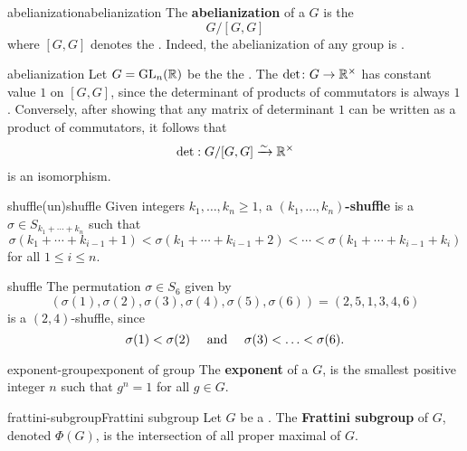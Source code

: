\begin{topic}{abelianization}{abelianization}
    The \textbf{abelianization} of a  $G$ is the 
    \[ G/[G, G] \]
    where $[G, G]$ denotes the . Indeed, the abelianization of any group is .
\end{topic}

\begin{example}{abelianization}
    Let $G = \textup{GL}_n(\mathbb{R})$ be the the . The  $\det \colon G \to \mathbb{R}^\times$ has constant value $1$ on $[G, G]$, since the determinant of products of commutators is always $1$. Conversely, after showing that any matrix of determinant $1$ can be written as a product of commutators, it follows that
    \[ \det : G / [G, G] \xrightarrow{\sim} \mathbb{R}^\times \]
    is an isomorphism.
\end{example}

\begin{topic}{shuffle}{(un)shuffle}
    Given integers $k_1, \ldots, k_n \ge 1$, a \textbf{$(k_1, \ldots, k_n)$-shuffle} is a  $\sigma \in S_{k_1 + \cdots + k_n}$ such that
    \[ \sigma(k_1 + \cdots + k_{i - 1} + 1) < \sigma(k_1 + \cdots + k_{i - 1} + 2) < \cdots < \sigma(k_1 + \cdots + k_{i - 1} + k_i) \]
    for all $1 \le i \le n$.
\end{topic}

\begin{example}{shuffle}
    The permutation $\sigma \in S_6$ given by
    \[ (\sigma(1), \sigma(2), \sigma(3), \sigma(4), \sigma(5), \sigma(6)) = (2, 5, 1, 3, 4, 6) \]
    is a $(2, 4)$-shuffle, since
    \[ \sigma(1) < \sigma(2) \quad \textup{ and } \quad \sigma(3) < \ldots < \sigma(6) . \]
\end{example}

\begin{topic}{exponent-group}{exponent of group}
    The \textbf{exponent} of a  $G$, is the smallest positive integer $n$ such that $g^n = 1$ for all $g \in G$.
\end{topic}

\begin{topic}{frattini-subgroup}{Frattini subgroup}
    Let $G$ be a . The \textbf{Frattini subgroup} of $G$, denoted $\Phi(G)$, is the intersection of all proper maximal  of $G$.
\end{topic}

